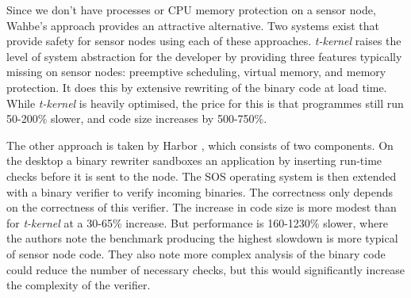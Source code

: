 Since we don't have processes or CPU memory protection on a sensor node, Wahbe's approach provides an attractive alternative. Two systems exist that provide safety for sensor nodes using each of these approaches. \emph{t-kernel} raises the level of system abstraction for the developer by providing three features typically missing on sensor nodes: preemptive scheduling, virtual memory, and memory protection. It does this by extensive rewriting of the binary code at load time. While \emph{t-kernel} is heavily optimised, the price for this is that programmes still run 50-200\% slower, and code size increases by 500-750\%.

The other approach is taken by Harbor \cite{Kumar:2007ge}, which consists of two components. On the desktop a binary rewriter sandboxes an application by inserting run-time checks before it is sent to the node. The SOS operating system \cite{Han:2005th} is then extended with a binary verifier to verify incoming binaries. The correctness only depends on the correctness of this verifier. The increase in code size is more modest than for \emph{t-kernel} at a 30-65\% increase. But performance is 160-1230\% slower, where the authors note the benchmark producing the highest slowdown is more typical of sensor node code. They also note more complex analysis of the binary code could reduce the number of necessary checks, but this would significantly increase the complexity of the verifier.


